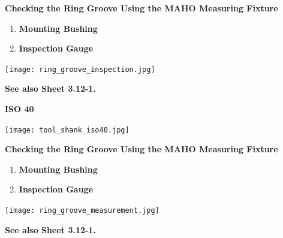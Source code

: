 \vspace{0.5cm}

\textbf{Checking the Ring Groove Using the MAHO Measuring Fixture}

\begin{enumerate}[itemsep=1pt,parsep=0pt]
    \item \textbf{Mounting Bushing}
    \item \textbf{Inspection Gauge}
\end{enumerate}

\vspace{0.5cm}

\begin{minipage}{\textwidth}
    \centering
    \texttt{[image: ring\_groove\_inspection.jpg]}
\end{minipage}

\vspace{0.5cm}

\noindent \textbf{See also Sheet 3.12-1.}


\setcounter{page}{3}

\textbf{ISO 40}

\vspace{0.5cm}

\begin{minipage}{\textwidth}
    \centering
    \texttt{[image: tool\_shank\_iso40.jpg]}
\end{minipage}

\vspace{0.5cm}

\textbf{Checking the Ring Groove Using the MAHO Measuring Fixture}

\begin{enumerate}[itemsep=1pt,parsep=0pt]
    \item \textbf{Mounting Bushing}
    \item \textbf{Inspection Gauge}
\end{enumerate}

\vspace{0.5cm}

\begin{minipage}{\textwidth}
    \centering
    \texttt{[image: ring\_groove\_measurement.jpg]}
\end{minipage}

\vspace{0.5cm}

\noindent \textbf{See also Sheet 3.12-1.}

